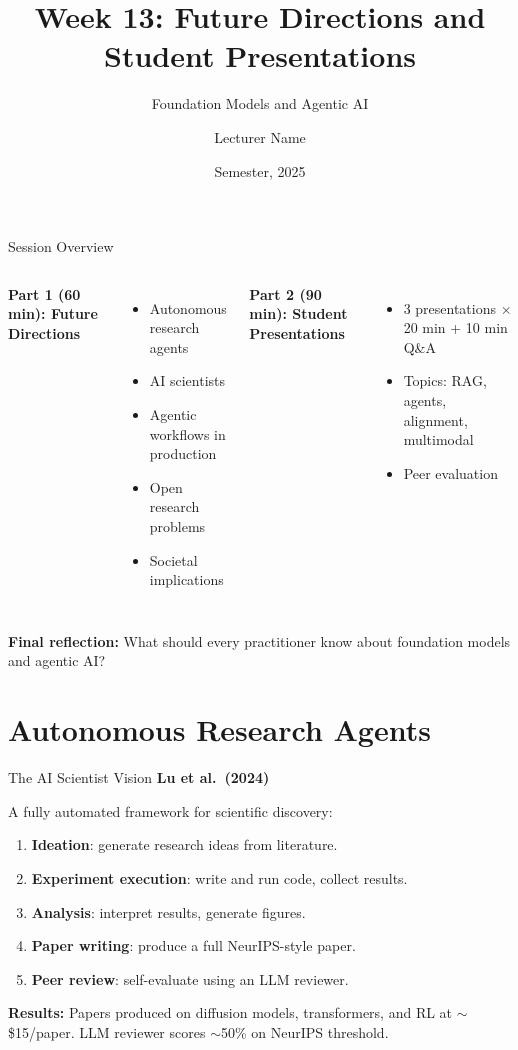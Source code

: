 \documentclass[aspectratio=169,10pt]{beamer}
\title{Week 13: Future Directions and Student Presentations}
\subtitle{Foundation Models and Agentic AI}
\author{Lecturer Name}
\institute{Holon Institute of Technology (HIT)}
\date{Semester, 2025}
\begin{document}
\begin{frame}
  \titlepage
\end{frame}

\begin{frame}{Session Overview}
  \begin{columns}[T]
      \textbf{Part 1 (60 min): Future Directions}
      \begin{itemize}
        \item Autonomous research agents
        \item AI scientists
        \item Agentic workflows in production
        \item Open research problems
        \item Societal implications
      \end{itemize}
      \textbf{Part 2 (90 min): Student Presentations}
      \begin{itemize}
        \item 3 presentations $\times$ 20 min + 10 min Q\&A
        \item Topics: RAG, agents, alignment, multimodal
        \item Peer evaluation
      \end{itemize}
  \end{columns}
  \vspace{0.4em}
  \textbf{Final reflection:} What should every practitioner know about foundation models and agentic AI?
\end{frame}

\section{Autonomous Research Agents}

\begin{frame}{The AI Scientist Vision}
  \textbf{Lu et al.\ (2024)}~\cite{lu2024aiscientist}
  \vspace{0.4em}
  \begin{tcolorbox}[hitbox, title=The AI Scientist]
    A fully automated framework for scientific discovery:
    \begin{enumerate}
      \item \textbf{Ideation}: generate research ideas from literature.
      \item \textbf{Experiment execution}: write and run code, collect results.
      \item \textbf{Analysis}: interpret results, generate figures.
      \item \textbf{Paper writing}: produce a full NeurIPS-style paper.
      \item \textbf{Peer review}: self-evaluate using an LLM reviewer.
    \end{enumerate}
  \end{tcolorbox}
  \vspace{0.3em}
  \textbf{Results:} Papers produced on diffusion models, transformers, and RL at $\sim$\$15/paper.
  LLM reviewer scores $\sim$50\% on NeurIPS threshold.
\end{frame}
\end{document}

